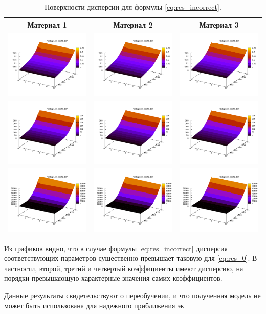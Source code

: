 \documentclass[12pt,a4paper]{article}
\theoremstyle{definition}
\begin{document}
\begin{table}[h]
  \centering
  \begin{tabular}{c c c}
	Материал 1 & Материал 2 & Материал 3 \\ \hline
	\includegraphics[scale=0.20]{figs/all/p1.txt_coeff0.dat.pdf} & \includegraphics[scale=0.20]{figs/all/p2.txt_coeff0.dat.pdf} & \includegraphics[scale=0.20]{figs/all/p3.txt_coeff0.dat.pdf} \\
	\includegraphics[scale=0.20]{figs/all/p1.txt_coeff1.dat.pdf} & \includegraphics[scale=0.20]{figs/all/p2.txt_coeff1.dat.pdf} & \includegraphics[scale=0.20]{figs/all/p3.txt_coeff1.dat.pdf} \\
	\includegraphics[scale=0.20]{figs/all/p1.txt_coeff2.dat.pdf} & \includegraphics[scale=0.20]{figs/all/p2.txt_coeff2.dat.pdf} & \includegraphics[scale=0.20]{figs/all/p3.txt_coeff2.dat.pdf} %
  \end{tabular}
  \caption{Поверхности дисперсии для формулы \eqref{eq:res_incorrect}.}
  \label{tabl:res_incorrect}
\end{table}

Из графиков видно, что в случае формулы \eqref{eq:res_incorrect} дисперсия соответствующих
параметров существенно превышает таковую для \eqref{eq:res_0}. В частности, второй, третий
и четвертый коэффициенты имеют дисперсию, на порядки превышающую характерные значения самих
коэффициентов.

Данные результаты свидетельствуют о переобучении, и что полученная модель не может быть
использована для надежного приближения эк
\end{document}
